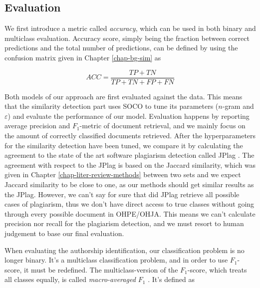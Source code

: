 \subsection{Evaluation} \label{chap-method-evaluation}

We first introduce a metric called \emph{accuracy}, which can be used in both binary and multiclass evaluation. Accuracy score, simply being the fraction between correct predictions and the total number of predictions, can be defined by using the confusion matrix given in Chapter \ref{chap-bg-sim} as

\begin{equation}
    ACC = \dfrac{TP + TN}{TP + TN + FP + FN}
\end{equation}

Both models of our approach are first evaluated against the data. This means that the similarity detection part uses SOCO to tune its parameters ($n$-gram and $\varepsilon$) and evaluate the performance of our model. Evaluation happens by reporting average precision and $F_1$-metric of document retrieval, and we mainly focus on the amount of correctly classified documents retrieved. After the hyperparameters for the similarity detection have been tuned, we compare it by calculating the agreement to the state of the art software plagiarism detection called JPlag \cite{prechelt2002finding}. The agreement with respect to the JPlag is based on the Jaccard similarity, which was given in Chapter \ref{chap-liter-review-methods} between two sets and we expect Jaccard similarity to be close to one, as our methods should get similar results as the JPlag. However, we can't say for sure that did JPlag retrieve all possible cases of plagiarism, thus we don't have direct access to true classes without going through every possible document in OHPE/OHJA. This means we can't calculate precision nor recall for the plagiarism detection, and we must resort to human judgement to base our final evaluation. 







When evaluating the authorship identification, our classification problem is no longer binary. It's a multiclass classification problem, and in order to use $F_1$-score, it must be redefined. The multiclass-version of the $F_1$-score, which treats all classes equally, is called \emph{macro-averaged $F_1$} \cite{SOKOLOVA2009427}. It's defined as 

